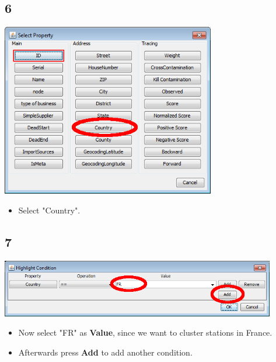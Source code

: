 \documentclass{beamer}
\begin{document}
\subsection{6}
\begin{frame}
	\begin{center}
  		\includegraphics[width=0.7\textwidth]{6.png}
	\end{center}
	\begin{itemize}
		\item Select "Country".
	\end{itemize}
\end{frame}

\subsection{7}
\begin{frame}
	\begin{center}
  		\includegraphics[width=0.9\textwidth]{7.png}
	\end{center}
	\begin{itemize}
		\item Now select "FR" as \textbf{Value}, since we want to cluster stations in France.
		\item Afterwards press \textbf{Add} to add another condition.
	\end{itemize}
\end{frame}
\end{document}
